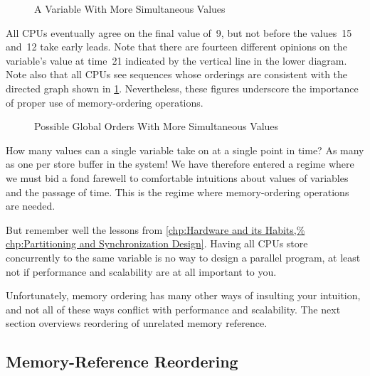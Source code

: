 \begin{figure}
\centering
{}
\caption{A Variable With More Simultaneous Values}
\end{figure}

All CPUs eventually agree on the final value of~9, but not before
the values~15 and~12 take early leads.
Note that there are fourteen different opinions on the variable's value
at time~21 indicated by the vertical line in the lower diagram.
Note also that all CPUs see sequences whose orderings are consistent with
the directed graph shown in
\cref{fig:memorder:Possible Global Orders With More Simultaneous Values}.
Nevertheless, these figures underscore the importance of
proper use of memory-ordering operations.

\begin{figure}
\centering
{}
\caption{Possible Global Orders With More Simultaneous Values}
\label{fig:memorder:Possible Global Orders With More Simultaneous Values}
\end{figure}

How many values can a single variable take on at a single point in
time?
As many as one per store buffer in the system!
We have therefore entered a regime where we must bid a fond farewell to
comfortable intuitions about values of variables and the passage of time.
This is the regime where memory-ordering operations are needed.

But remember well the lessons from
\cref{chp:Hardware and its Habits,%
chp:Partitioning and Synchronization Design}.
Having all CPUs store concurrently to the same variable
is no way to design a parallel program, at least
not if performance and scalability are at all important to you.

Unfortunately, memory ordering has many other ways of insulting your
intuition, and not all of these ways conflict with performance and
scalability.
The next section overviews reordering of unrelated memory reference.

\subsection{Memory-Reference Reordering}
\label{sec:memorder:Memory-Reference Reordering}

